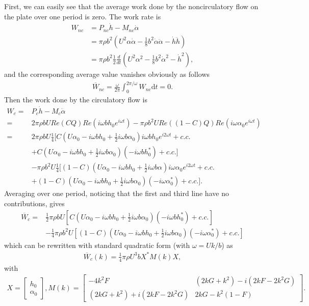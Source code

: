First, we can easily see that the average work done by the noncirculatory flow on the plate over one period is zero. 
The work rate is
\begin{align}
W_{nc} & =  P_{nc} \dot{h} - M_{nc} \dot{\alpha}  \\
       & =  \pi \rho b^2 (U^2 \alpha \dot{\alpha} - \frac{1}{8} b^2 \dot{\alpha} \ddot{\alpha} - \dot{h} \ddot{h})  \\
       & =  \pi \rho b^2 \frac{1}{2} \frac{d}{dt} (U^2 {\alpha}^2 - \frac{1}{8} b^2 {\dot{\alpha}}^2 - {\dot{h}}^2 ),
\end{align}
and the corresponding average value vanishes obviously as follows
\begin{align}
\overline{W}_{nc} = \frac{\omega}{2\pi} \int_{0}^{2\pi/\omega} W_{nc} \mathrm{d}t = 0.
\end{align}
Then the work done by the circulatory flow is
\begin{align}
W_{c}   = & P_{c} \dot{h} - M_{c} \dot{\alpha}  \\
         = & 2\pi \rho b U Re(CQ) Re(i \omega bh_0 e^{i\omega t}) - \pi \rho b^2 U Re( (1 - C)Q ) Re( i \omega \alpha_0 e^{i\omega t} )  \\
     = & 2\pi \rho b U \frac{1}{4} [ C(U\alpha_0 - i \omega bh_0 + \frac{1}{2} i \omega b\alpha_0) i \omega bh_0 e^{i2\omega t} + c.c. \\
       &  + C(U \alpha_0 - i \omega bh_0 + \frac{1}{2} i\omega b\alpha_0) (-i \omega b h_0^{*}) + c.c.]  \\
       &  - \pi \rho b^2 U \frac{1}{4} [ (1 - C) (U \alpha_0 - i \omega b h_0 + \frac{1}{2} i\omega b\alpha) i\omega \alpha_0 e^{i2\omega t} + c.c. \\
       &   + (1 - C) (U \alpha_0 - i \omega bh_0 + \frac{1}{2} i\omega b\alpha_0) (-i\omega \alpha_0^{*}) + c.c.].
\end{align}
Averaging over one period, noticing that the first and third line have no contributions, gives 
\begin{align}
\overline{W}_{c}  = & \frac{1}{2} \pi \rho b U [C(U \alpha_0 - i \omega bh_0 + \frac{1}{2} i\omega b \alpha_0) (-i \omega b h_0^{*}) + c.c.]     \\
                                  & - \frac{1}{4} \pi \rho b^2 U [(1 - C) (U \alpha_0 - i \omega bh_0 + \frac{1}{2} i\omega b\alpha_0) (-i\omega \alpha_0^{*}) + c.c.]
\end{align}
which can be rewritten with standard quadratic form (with $\omega = Uk/b$) as
\begin{align}
\overline{W}_{c}(k)  = \frac{1}{4}{\pi \rho U^3 b} X^* M(k) X,
\end{align}
with
\begin{align}
X =  \begin{bmatrix} h_0  \\  \alpha_0   \end{bmatrix},
M(k) = \begin{bmatrix}   -4k^2 F   &  (2kG+k^2) - i(2kF - 2k^2G)  \\
                         (2kG+k^2) + i(2kF - 2k^2G)  &   2kG - k^2(1 - F)  \end{bmatrix}.
\end{align}

